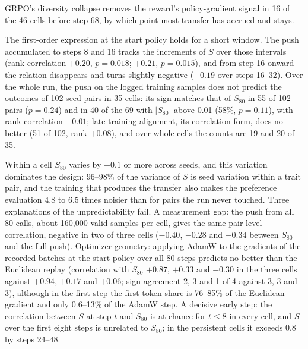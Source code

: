 GRPO's diversity collapse removes the reward's policy-gradient signal in 16 of the 46 cells before step 68, by which point most transfer has accrued and stays.


The first-order expression at the start policy holds for a short window. The push accumulated to steps 8 and 16 tracks the increments of $S$ over those intervals (rank correlation $+0.20$, $p = 0.018$; $+0.21$, $p = 0.015$), and from step 16 onward the relation disappears and turns slightly negative ($-0.19$ over steps 16--32). Over the whole run, the push on the logged training samples does not predict the outcomes of 102 seed pairs in 35 cells: its sign matches that of $S_{80}$ in 55 of 102 pairs ($p = 0.24$) and in 40 of the 69 with $|S_{80}|$ above 0.01 (58\%, $p = 0.11$), with rank correlation $-0.01$; late-training alignment, its correlation form, does no better (51 of 102, rank $+0.08$), and over whole cells the counts are 19 and 20 of 35.

Within a cell $S_{80}$ varies by $\pm0.1$ or more across seeds, and this variation dominates the design: 96--98\% of the variance of $S$ is seed variation within a trait pair, and the training that produces the transfer also makes the preference evaluation 4.8 to 6.5 times noisier than for pairs the run never touched. Three explanations of the unpredictability fail. A measurement gap: the push from all 80 calls, about 160{,}000 valid samples per cell, gives the same pair-level correlation, negative in two of three cells ($-0.40$, $-0.28$ and $-0.34$ between $S_{80}$ and the full push). Optimizer geometry: applying AdamW to the gradients of the recorded batches at the start policy over all 80 steps predicts no better than the Euclidean replay (correlation with $S_{80}$ $+0.87$, $+0.33$ and $-0.30$ in the three cells against $+0.94$, $+0.17$ and $+0.06$; sign agreement 2, 3 and 1 of 4 against 3, 3 and 3), although in the first step the first-token share is 76--85\% of the Euclidean gradient and only 0.6--13\% of the AdamW step. A decisive early step: the correlation between $S$ at step $t$ and $S_{80}$ is at chance for $t\leq8$ in every cell, and $S$ over the first eight steps is unrelated to $S_{80}$; in the persistent cells it exceeds 0.8 by steps 24--48.

